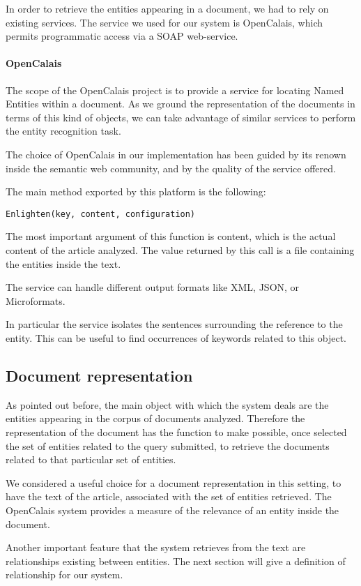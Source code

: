 \documentclass{acm_proc_article-sp-sigmod07}
\begin{document}
In order to retrieve the entities appearing in a document, we had to rely
on existing services. The service we used for our system is OpenCalais,
which permits programmatic access via a SOAP web-service.

\paragraph*{OpenCalais}
The scope of the OpenCalais project is to provide a service for locating
Named Entities within a document. As we ground the representation of the
documents in terms of this kind of objects, we can take advantage of
similar services to perform the entity recognition task.

The choice of OpenCalais in our implementation has been guided by its
renown inside the semantic web community, and by the quality of the
service offered.

The main method exported by this platform is the following:
\begin{verbatim}
Enlighten(key, content, configuration)
\end{verbatim}
The most important argument of this function is content, which is the
actual content of the article analyzed. The value returned by this call is
a file containing the entities inside the text.

The service can handle different output formats like XML, JSON, or
Microformats. 

In particular the service isolates the sentences surrounding the
reference to the entity. This can be useful to find occurrences of
keywords related to this object.


\subsection{Document representation}
As pointed out before, the main object with which the system deals are the
entities appearing in the corpus of documents analyzed. Therefore the
representation of the document has the function to make possible, once
selected the set of entities related to the query submitted, to retrieve
the documents related to that particular set of entities.

We considered a useful choice for a document representation in this
setting, to have the text of the article, associated with the set of
entities retrieved.
The OpenCalais system provides a measure of the relevance of an entity
inside the document.

Another important feature that the system retrieves from the text are
relationships existing between entities. The next section will give a
definition of relationship for our system.
\end{document}
